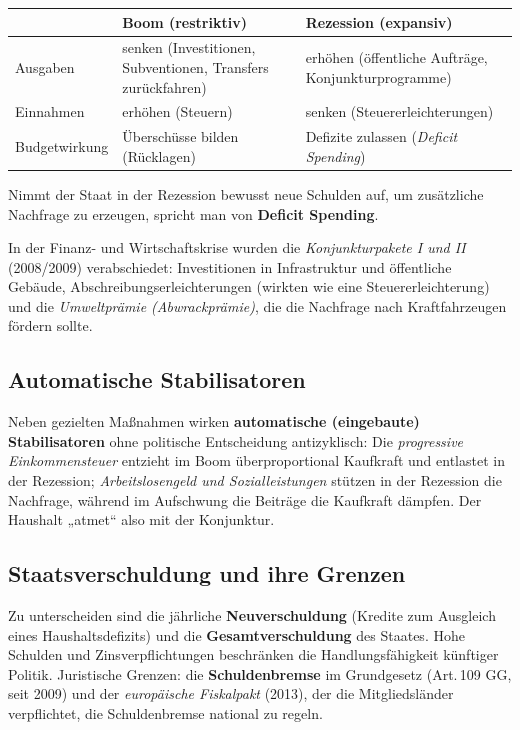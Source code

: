 \documentclass[11pt, a4paper]{article}
\begin{document}
\begin{center}
\begin{tabular}{p{3.2cm} p{5.2cm} p{5.2cm}}
\toprule
 & \textbf{Boom (restriktiv)} & \textbf{Rezession (expansiv)}\\
\midrule
Ausgaben & senken (Investitionen, Subventionen, Transfers zurückfahren) & erhöhen (öffentliche Aufträge, Konjunkturprogramme)\\
Einnahmen & erhöhen (Steuern) & senken (Steuererleichterungen)\\
Budgetwirkung & Überschüsse bilden (Rücklagen) & Defizite zulassen (\emph{Deficit Spending})\\
\bottomrule
\end{tabular}
\end{center}

Nimmt der Staat in der Rezession bewusst neue Schulden auf, um zusätzliche Nachfrage zu
erzeugen, spricht man von \textbf{Deficit Spending}.

\begin{beispiel}
In der Finanz- und Wirtschaftskrise wurden die \emph{Konjunkturpakete I und II} (2008/2009)
verabschiedet: Investitionen in Infrastruktur und öffentliche Gebäude,
Abschreibungserleichterungen (wirkten wie eine Steuererleichterung) und die
\emph{Umweltprämie (Abwrackprämie)}, die die Nachfrage nach Kraftfahrzeugen fördern sollte.
\end{beispiel}

\subsection{Automatische Stabilisatoren}

Neben gezielten Maßnahmen wirken \textbf{automatische (eingebaute) Stabilisatoren} ohne
politische Entscheidung antizyklisch: Die \emph{progressive Einkommensteuer} entzieht im
Boom überproportional Kaufkraft und entlastet in der Rezession; \emph{Arbeitslosengeld und
Sozialleistungen} stützen in der Rezession die Nachfrage, während im Aufschwung die
Beiträge die Kaufkraft dämpfen. Der Haushalt „atmet`` also mit der Konjunktur.

\subsection{Staatsverschuldung und ihre Grenzen}

Zu unterscheiden sind die jährliche \textbf{Neuverschuldung} (Kredite zum Ausgleich eines
Haushaltsdefizits) und die \textbf{Gesamtverschuldung} des Staates. Hohe Schulden und
Zinsverpflichtungen beschränken die Handlungsfähigkeit künftiger Politik. Juristische
Grenzen: die \textbf{Schuldenbremse} im Grundgesetz (Art.\,109 GG, seit 2009) und der
\emph{europäische Fiskalpakt} (2013), der die Mitgliedsländer verpflichtet, die
Schuldenbremse national zu regeln.
\end{document}
